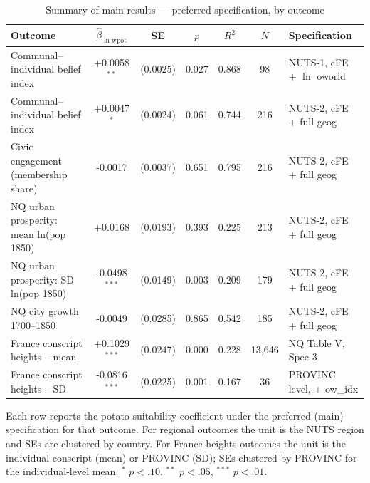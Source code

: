 %
%



\begin{table}[!htbp]\centering
\caption{Summary of main results --- preferred specification, by outcome}
\label{tab:summary}
\small
\begin{threeparttable}
\begin{tabular}{lcccccl}
\toprule
Outcome & $\hat\beta_{\ln\mathrm{wpot}}$ & SE & $p$ & $R^2$ & $N$ & Specification \\
\midrule
Communal--individual belief index & +0.0058$^{**}$ & (0.0025) & 0.027 & 0.868 & 98 & NUTS-1, cFE + $\ln$ oworld \\
Communal--individual belief index & +0.0047$^{*}$ & (0.0024) & 0.061 & 0.744 & 216 & NUTS-2, cFE + full geog \\
Civic engagement (membership share) & -0.0017 & (0.0037) & 0.651 & 0.795 & 216 & NUTS-2, cFE + full geog \\
NQ urban prosperity: mean ln(pop 1850) & +0.0168 & (0.0193) & 0.393 & 0.225 & 213 & NUTS-2, cFE + full geog \\
NQ urban prosperity: SD ln(pop 1850) & -0.0498$^{***}$ & (0.0149) & 0.003 & 0.209 & 179 & NUTS-2, cFE + full geog \\
NQ city growth 1700--1850 & -0.0049 & (0.0285) & 0.865 & 0.542 & 185 & NUTS-2, cFE + full geog \\
France conscript heights -- mean & +0.1029$^{***}$ & (0.0247) & 0.000 & 0.228 & 13,646 & NQ Table V, Spec 3 \\
France conscript heights -- SD & -0.0816$^{***}$ & (0.0225) & 0.001 & 0.167 & 36 & PROVINC level, + ow\_idx \\
\bottomrule
\end{tabular}
\begin{tablenotes}\footnotesize
\item Each row reports the potato-suitability coefficient under the preferred (main) specification for that outcome.
For regional outcomes the unit is the NUTS region and SEs are clustered by country.
For France-heights outcomes the unit is the individual conscript (mean) or PROVINC (SD); SEs clustered by PROVINC for the individual-level mean.
$^{*}$ $p<.10$, $^{**}$ $p<.05$, $^{***}$ $p<.01$.
\end{tablenotes}
\end{threeparttable}
\end{table}

